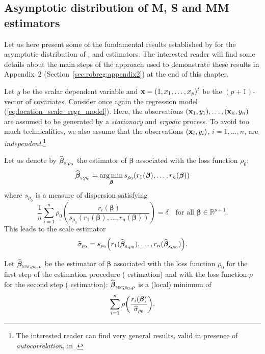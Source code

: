 \subsection{Asymptotic distribution of M, S and MM estimators}
\label{subsec:asymptotic_distr_M_S_MM_estimators}

Let us here present some of the fundamental results established by
\citet{Croux:2003} for the asymptotic distribution of ,  and
 estimators. The interested reader will find some details about the
main steps of the approach used to demonstrate these results in Appendix~2
(Section~\ref{sec:robreg:appendix2}) at the end of this chapter.

Let $y$ be the scalar dependent variable and $\mathbf x = (1, x_1, \dots,
x_p)^t$ be the $(p+1)$-vector of covariates. Consider once again the regression
model (\ref{eq:location_scale_regr_model}). Here, the observations
$(\mathbf x_1, y_1), \dots, (\mathbf x_n, y_n)$ are assumed to be generated by
a \emph{stationary} and \emph{ergodic} process. To avoid too much
technicalities, we also assume that the observations $(\mathbf x_i, y_i)$, $i =
1, \dots, n$, are \emph{independent}.\footnote{The interested reader can find
very general results, valid in presence of \emph{autocorrelation}, in
\citet{Croux:2003}.}

Let us denote by $\sthat{\boldsymbol\beta}_{\stsc{S};\rho_0}$ the
 estimator of $\boldsymbol\beta$ associated with the loss function
$\rho_{0}$:
\[
    \sthat{\boldsymbol\beta}_{\stsc{S};\rho_0} = 
    \argmin_{\boldsymbol{\beta}} s_{\rho_0}(r_1(\boldsymbol\beta), \dots, 
    r_{n}(\boldsymbol\beta))
\]
where $s_{\rho_0}$ is a measure of dispersion satisfying
\[
    \frac{1}{n} \sum_{i=1}^{n} 
    \rho_0\left(\frac{r_{i}(\boldsymbol\beta)}{s_{\rho_0}(r_1(\boldsymbol\beta), 
        \dots, r_n(\boldsymbol\beta))}\right) 
    = \delta\quad\text{for all $\boldsymbol\beta \in \mathbb{R}^{p+1}$.}
\]
This leads to the scale  estimator
\[
    \sthat{\sigma}_{\rho_0} = 
    s_{\rho_0} \left(r_1(\widehat{\boldsymbol\beta}_{\stsc{S};\rho_0}), \dots, 
    r_n(\sthat{\boldsymbol\beta}_{\stsc{S};\rho_0})\right).
\]

Let $\sthat{\boldsymbol\beta}_{\stsc{MM};\rho_0,\rho}$ be the 
estimator of $\boldsymbol\beta$ associated with the loss function $\rho_0$ for
the first step of the estimation procedure ( estimation) and with the
loss function $\rho$ for the second step ( estimation):
$\sthat{\boldsymbol\beta}_{\stsc{MM};\rho_0,\rho}$ is a (local) minimum of
\[
    \sum_{i=1}^{n} \rho\left(\frac{r_i(\boldsymbol\beta)}{\sthat{\sigma}_{\rho_0}}\right).
\]

